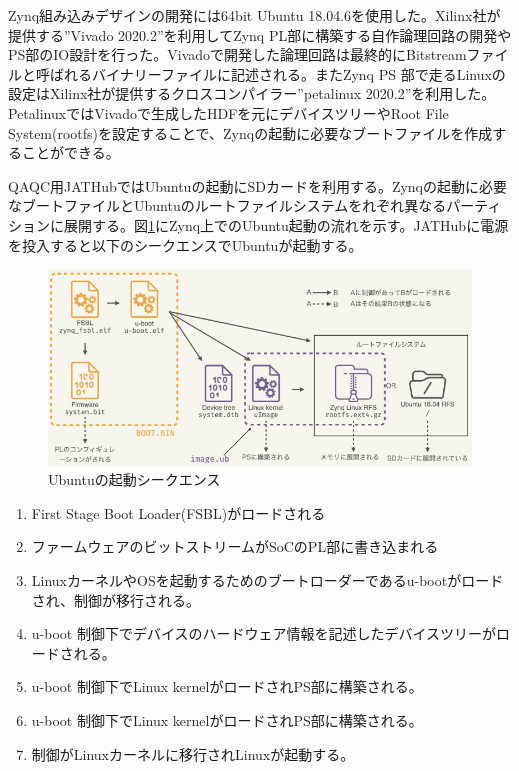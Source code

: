 Zynq組み込みデザインの開発には64bit Ubuntu 18.04.6を使用した。Xilinx社が提供する”Vivado 2020.2”を利用してZynq PL部に構築する自作論理回路の開発やPS部のIO設計を行った。Vivadoで開発した論理回路は最終的にBitstreamファイルと呼ばれるバイナリーファイルに記述される。またZynq PS 部で走るLinuxの設定はXilinx社が提供するクロスコンパイラー”petalinux 2020.2”を利用した。PetalinuxではVivadoで生成したHDFを元にデバイスツリーやRoot File System(rootfs)を設定することで、Zynqの起動に必要なブートファイルを作成することができる。\par
QAQC用JATHubではUbuntuの起動にSDカードを利用する。Zynqの起動に必要なブートファイルとUbuntuのルートファイルシステムをれぞれ異なるパーティションに展開する。図\ref{JATHubboot}にZynq上でのUbuntu起動の流れを示す\cite{mt_okazaki}。JATHubに電源を投入すると以下のシークエンスでUbuntuが起動する。

\begin{figure} 
\centering
\includegraphics[width=16cm]{fig/JATHubboot.png}
\caption[Ubuntuの起動シークエンス]{Ubuntuの起動シークエンス}
\label{JATHubboot}
\end{figure}

\begin{enumerate}
    \item First Stage Boot Loader(FSBL)がロードされる
    \item ファームウェアのビットストリームがSoCのPL部に書き込まれる
    \item LinuxカーネルやOSを起動するためのブートローダーであるu-bootがロードされ、制御が移行される。
    \item u-boot 制御下でデバイスのハードウェア情報を記述したデバイスツリーがロードされる。
    \item u-boot 制御下でLinux kernelがロードされPS部に構築される。
    \item u-boot 制御下でLinux kernelがロードされPS部に構築される。
    \item 制御がLinuxカーネルに移行されLinuxが起動する。
\end{enumerate}

